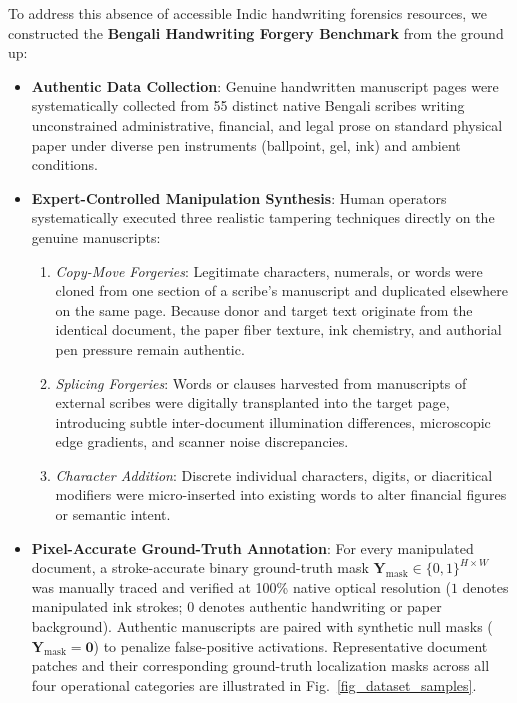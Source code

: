 \documentclass[runningheads]{llncs}
\begin{document}
To address this absence of accessible Indic handwriting forensics resources, we constructed the \textbf{Bengali Handwriting Forgery Benchmark} from the ground up:
\begin{itemize}
    \item \textbf{Authentic Data Collection}: Genuine handwritten manuscript pages were systematically collected from 55 distinct native Bengali scribes writing unconstrained administrative, financial, and legal prose on standard physical paper under diverse pen instruments (ballpoint, gel, ink) and ambient conditions.
    \item \textbf{Expert-Controlled Manipulation Synthesis}: Human operators systematically executed three realistic tampering techniques directly on the genuine manuscripts:
    \begin{enumerate}[1.]
        \item \textit{Copy-Move Forgeries}: Legitimate characters, numerals, or words were cloned from one section of a scribe's manuscript and duplicated elsewhere on the same page. Because donor and target text originate from the identical document, the paper fiber texture, ink chemistry, and authorial pen pressure remain authentic.
        \item \textit{Splicing Forgeries}: Words or clauses harvested from manuscripts of external scribes were digitally transplanted into the target page, introducing subtle inter-document illumination differences, microscopic edge gradients, and scanner noise discrepancies.
        \item \textit{Character Addition}: Discrete individual characters, digits, or diacritical modifiers were micro-inserted into existing words to alter financial figures or semantic intent.
    \end{enumerate}
    \item \textbf{Pixel-Accurate Ground-Truth Annotation}: For every manipulated document, a stroke-accurate binary ground-truth mask $\mathbf{Y}_{\text{mask}} \in \{0, 1\}^{H \times W}$ was manually traced and verified at 100\% native optical resolution ($1$ denotes manipulated ink strokes; $0$ denotes authentic handwriting or paper background). Authentic manuscripts are paired with synthetic null masks ($\mathbf{Y}_{\text{mask}} = \mathbf{0}$) to penalize false-positive activations. Representative document patches and their corresponding ground-truth localization masks across all four operational categories are illustrated in Fig.~\ref{fig_dataset_samples}.
\end{itemize}
\end{document}
